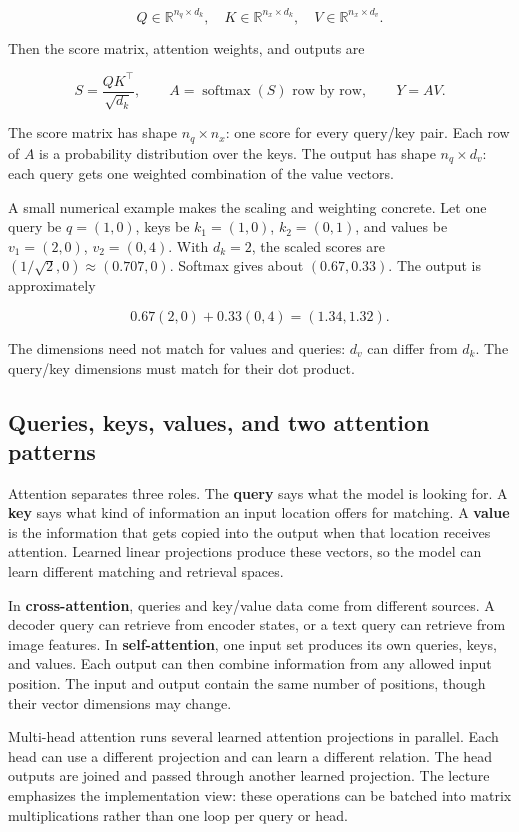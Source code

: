 \[
Q\in\mathbb{R}^{n_q\times d_k},\quad
K\in\mathbb{R}^{n_x\times d_k},\quad
V\in\mathbb{R}^{n_x\times d_v}.
\]

Then the score matrix, attention weights, and outputs are

\[
S=\frac{QK^\top}{\sqrt{d_k}},\qquad
A=\operatorname{softmax}(S)\text{ row by row},\qquad
Y=AV.
\]

The score matrix has shape \(n_q\times n_x\): one score for every query/key pair. Each row of \(A\) is a probability distribution over the keys. The output has shape \(n_q\times d_v\): each query gets one weighted combination of the value vectors.

A small numerical example makes the scaling and weighting concrete. Let one query be \(q=(1,0)\), keys be \(k_1=(1,0)\), \(k_2=(0,1)\), and values be \(v_1=(2,0)\), \(v_2=(0,4)\). With \(d_k=2\), the scaled scores are \((1/\sqrt2,0)\approx(0.707,0)\). Softmax gives about \((0.67,0.33)\). The output is approximately

\[
0.67(2,0)+0.33(0,4)=(1.34,1.32).
\]

The dimensions need not match for values and queries: \(d_v\) can differ from \(d_k\). The query/key dimensions must match for their dot product.

\subsection{Queries, keys, values, and two attention patterns}\label{04-visual-computing-ii-ch031-queries-keys-values-and-two-attention-patterns}

Attention separates three roles. The \textbf{query} says what the model is looking for. A \textbf{key} says what kind of information an input location offers for matching. A \textbf{value} is the information that gets copied into the output when that location receives attention. Learned linear projections produce these vectors, so the model can learn different matching and retrieval spaces.

In \textbf{cross-attention}, queries and key/value data come from different sources. A decoder query can retrieve from encoder states, or a text query can retrieve from image features. In \textbf{self-attention}, one input set produces its own queries, keys, and values. Each output can then combine information from any allowed input position. The input and output contain the same number of positions, though their vector dimensions may change.

Multi-head attention runs several learned attention projections in parallel. Each head can use a different projection and can learn a different relation. The head outputs are joined and passed through another learned projection. The lecture emphasizes the implementation view: these operations can be batched into matrix multiplications rather than one loop per query or head.

